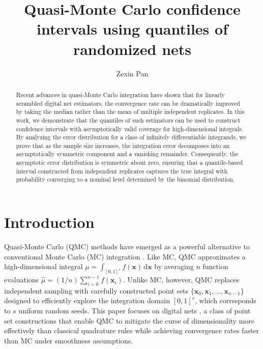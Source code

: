 \documentclass{article}
\makeatletter
\theoremstyle{definition}
\def\blfootnote{\gdef\@thefnmark{}\@footnotetext}
\newcommand{\bsx}{\boldsymbol{x}}
\newcommand{\rd}{\,\mathrm{d}}
\makeatother
\begin{document}
\title{Quasi-Monte Carlo confidence intervals using quantiles of randomized nets}
\author[1,2]{Zexin Pan}
  \date{}
\renewcommand\Affilfont{\footnotesize}
\blfootnote{\noindent Email addresses: \url{zep002@zju.edu.cn}}
\maketitle
\begin{abstract}

Recent advances in quasi-Monte Carlo integration have shown that for linearly scrambled digital net estimators, the convergence rate can be dramatically improved by taking the median rather than the mean of multiple independent replicates. In this work, we demonstrate that the quantiles of such estimators can be used to construct confidence intervals with asymptotically valid coverage for high-dimensional integrals. By analyzing the error distribution for a class of infinitely differentiable integrands, we prove that as the sample size increases, the integration error decomposes into an asymptotically symmetric component and a vanishing remainder. Consequently, the asymptotic error distribution is symmetric about zero, ensuring that a quantile-based interval constructed from independent replicates captures the true integral with probability converging to a nominal level determined by the binomial distribution.
\end{abstract}


\section{Introduction}

Quasi-Monte Carlo (QMC) methods have emerged as a powerful alternative to conventional Monte Carlo (MC) integration \cite{dick:kuo:sloa:2013}.
Like MC, QMC approximates a high-dimensional integral $\mu=\int_{[0,1]^s}f(\bsx)\rd\bsx$ by averaging $n$ function evaluations $\hat\mu=(1/n)\sum_{i=0}^{n-1}f(\bsx_i)$.
Unlike MC, however, QMC replaces independent sampling with carefully constructed point sets $\{\bsx_0, \bsx_1,\dots,\bsx_{n-1}\}$ designed to efficiently explore the integration domain $[0,1]^s$, which corresponds to $s$ uniform random seeds. This paper focuses on digital nets \cite{dick:pill:2010}, a class of point set constructions that enable QMC to mitigate the curse of dimensionality more effectively than classical quadrature rules while achieving convergence rates faster than MC under smoothness assumptions. 
\end{document}
